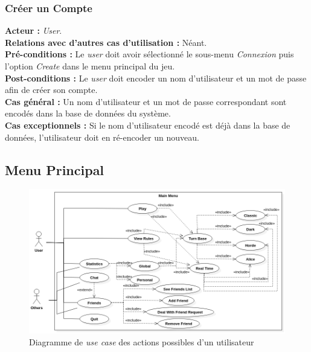 \documentclass[10pt, a4paper]{article}
\begin{document}
\subsubsection{Créer un Compte}
\textbf{Acteur :} \textit{User}.\\
\textbf{Relations avec d'autres cas d'utilisation :} Néant.\\
\textbf{Pré-conditions :} Le \textit{user} doit avoir sélectionné le sous-menu \textit{Connexion} puis l'option {\itshape Create} dans le menu principal du jeu.\\
\textbf{Post-conditions :} Le \textit{user} doit encoder un nom d'utilisateur et un mot de passe afin de créer son compte.\\
\textbf{Cas général :} Un nom d'utilisateur et un mot de passe correspondant sont encodés dans la base de données du système.\\
\textbf{Cas exceptionnels :} Si le nom d'utilisateur encodé est déjà dans la base de données, l'utilisateur doit en ré-encoder un nouveau.



\subsection{Menu Principal}

\begin{figure}[H]
\begin{center}
\includegraphics[scale=0.5]{MainMenuUseCase.png}
\caption{Diagramme de \textit{use case} des actions possibles d'un utilisateur}
\label{UC_menu} %
\end{center}
\end{figure}
\end{document}
